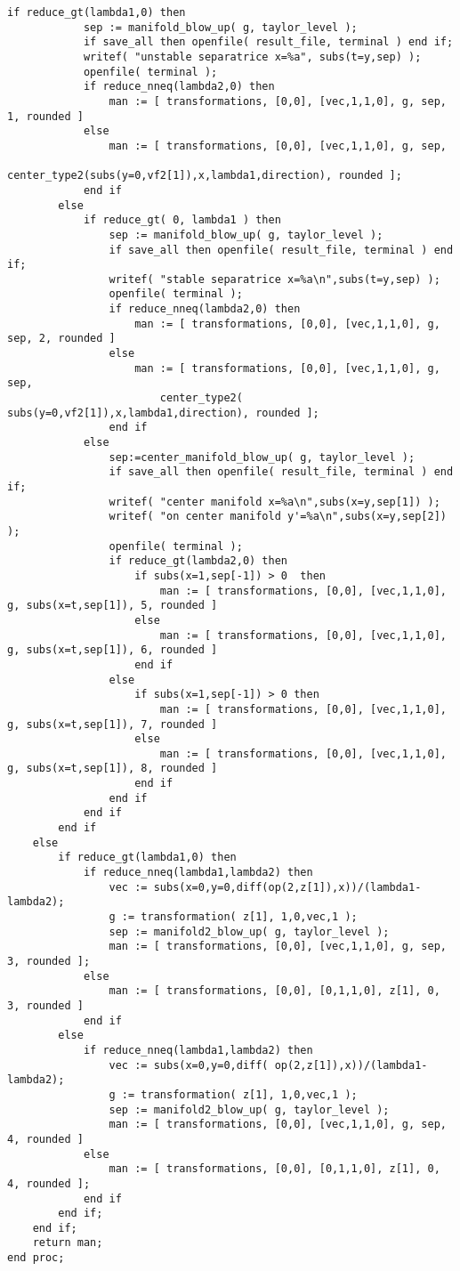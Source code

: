 \documentclass[a4paper,10pt]{article}
\begin{document}
\begin{lstlisting}[name=blowup]
        if reduce_gt(lambda1,0) then
            sep := manifold_blow_up( g, taylor_level );
            if save_all then openfile( result_file, terminal ) end if;
            writef( "unstable separatrice x=%a", subs(t=y,sep) );
            openfile( terminal );
            if reduce_nneq(lambda2,0) then
                man := [ transformations, [0,0], [vec,1,1,0], g, sep, 1, rounded ]
            else
                man := [ transformations, [0,0], [vec,1,1,0], g, sep,
                        center_type2(subs(y=0,vf2[1]),x,lambda1,direction), rounded ];
            end if
        else
            if reduce_gt( 0, lambda1 ) then
                sep := manifold_blow_up( g, taylor_level );
                if save_all then openfile( result_file, terminal ) end if;
                writef( "stable separatrice x=%a\n",subs(t=y,sep) );
                openfile( terminal );
                if reduce_nneq(lambda2,0) then
                    man := [ transformations, [0,0], [vec,1,1,0], g, sep, 2, rounded ]
                else
                    man := [ transformations, [0,0], [vec,1,1,0], g, sep,
                        center_type2( subs(y=0,vf2[1]),x,lambda1,direction), rounded ];
                end if
            else
                sep:=center_manifold_blow_up( g, taylor_level );
                if save_all then openfile( result_file, terminal ) end if;
                writef( "center manifold x=%a\n",subs(x=y,sep[1]) );
                writef( "on center manifold y'=%a\n",subs(x=y,sep[2]) );
                openfile( terminal );
                if reduce_gt(lambda2,0) then
                    if subs(x=1,sep[-1]) > 0  then
                        man := [ transformations, [0,0], [vec,1,1,0], g, subs(x=t,sep[1]), 5, rounded ]
                    else
                        man := [ transformations, [0,0], [vec,1,1,0], g, subs(x=t,sep[1]), 6, rounded ]
                    end if
                else
                    if subs(x=1,sep[-1]) > 0 then
                        man := [ transformations, [0,0], [vec,1,1,0], g, subs(x=t,sep[1]), 7, rounded ]
                    else
                        man := [ transformations, [0,0], [vec,1,1,0], g, subs(x=t,sep[1]), 8, rounded ]
                    end if
                end if
            end if
        end if
    else
        if reduce_gt(lambda1,0) then
            if reduce_nneq(lambda1,lambda2) then
                vec := subs(x=0,y=0,diff(op(2,z[1]),x))/(lambda1-lambda2);
                g := transformation( z[1], 1,0,vec,1 );
                sep := manifold2_blow_up( g, taylor_level );
                man := [ transformations, [0,0], [vec,1,1,0], g, sep, 3, rounded ];
            else
                man := [ transformations, [0,0], [0,1,1,0], z[1], 0, 3, rounded ]
            end if
        else
            if reduce_nneq(lambda1,lambda2) then
                vec := subs(x=0,y=0,diff( op(2,z[1]),x))/(lambda1-lambda2);
                g := transformation( z[1], 1,0,vec,1 );
                sep := manifold2_blow_up( g, taylor_level );
                man := [ transformations, [0,0], [vec,1,1,0], g, sep, 4, rounded ]
            else
                man := [ transformations, [0,0], [0,1,1,0], z[1], 0, 4, rounded ];
            end if
        end if;
    end if;
    return man;
end proc;


\end{lstlisting}
\end{document}
